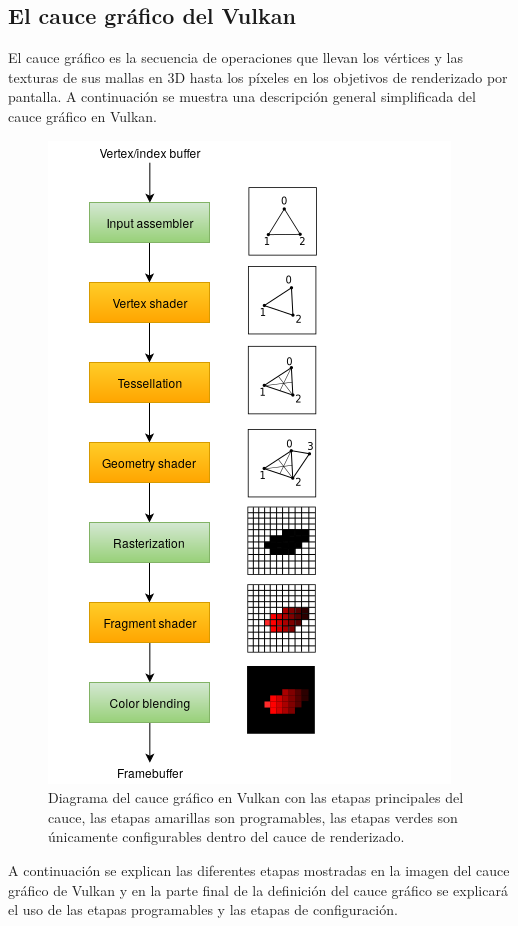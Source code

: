 \documentclass[a4paper, 17pt]{book}
\begin{document}
\subsection{El cauce gráfico del Vulkan} 
\label{subsec:CauceVulkan}

El cauce gráfico es la secuencia de operaciones que llevan los vértices y las texturas de sus mallas en 3D hasta
los píxeles en los objetivos de renderizado por pantalla. A continuación se muestra una descripción general
simplificada del cauce gráfico en Vulkan.

\begin{figure}[H]
    \centering
    \includegraphics[scale=0.5, keepaspectratio]{img/vulkan_simplified_pipeline.png}
    \caption{Diagrama del cauce gráfico en Vulkan con las etapas principales del cauce,
    las etapas amarillas son programables, las etapas verdes son únicamente configurables
    dentro del cauce de renderizado.}
    \label{figura:khronos}
\end{figure}

A continuación se explican las diferentes etapas mostradas en la imagen del cauce gráfico de Vulkan
y en la parte final de la definición del cauce gráfico se explicará el uso de las etapas programables
y las etapas de configuración.
\end{document}
